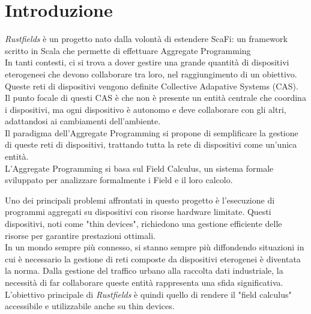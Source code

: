 \section{Introduzione}

\textit{Rustfields} è un progetto nato dalla volontà di estendere ScaFi: un framework scritto in Scala che permette di effettuare
Aggregate Programming \\

In tanti contesti, ci si trova a dover gestire una grande quantità di dispositivi eterogeneei che devono collaborare tra loro, nel
raggiungimento di un obiettivo. Queste reti di dispositivi vengono definite Collective Adapative Systems (CAS). \\

Il punto focale di questi CAS è che non è presente un entità centrale che coordina i dispositivi, ma ogni dispositivo è autonomo e
deve collaborare con gli altri, adattandosi ai cambiamenti dell'ambiente. \\

Il paradigma dell'Aggregate Programming si propone di semplificare la gestione di queste reti di dispositivi, trattando tutta la 
rete di dispositivi come un'unica entità. \\

L'Aggregate Programming si basa sul Field Calculus, un sistema formale sviluppato per analizzare formalmente i Field e il loro calcolo.

Uno dei principali problemi affrontati in questo progetto è l'esecuzione di programmi aggregati su dispositivi con risorse hardware 
limitate. Questi dispositivi, noti come "thin devices", richiedono una gestione efficiente delle risorse per garantire prestazioni ottimali. \\

In un mondo sempre più connesso, si stanno sempre più diffondendo situazioni in cui è necessario
la gestione di reti composte da dispositivi eterogenei è diventata la norma.
Dalla gestione del traffico urbano alla raccolta dati industriale, la necessità di far collaborare queste entità rappresenta una sfida 
significativa. \\

L'obiettivo principale di \textit{Rustfields} è quindi quello di rendere il "field calculus" accessibile e utilizzabile anche su thin devices.